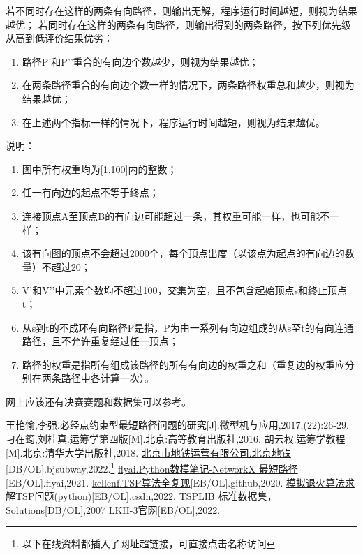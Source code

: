 \documentclass[12pt]{article}
\begin{document}
若不同时存在这样的两条有向路径，则输出无解，程序运行时间越短，则视为结果越优； 若同时存在这样的两条有向路径，则输出得到的两条路径，按下列优先级从高到低评价结果优劣：
\begin{enumerate}
	\item 路径P’和P’’重合的有向边个数越少，则视为结果越优；
	\item  在两条路径重合的有向边个数一样的情况下，两条路径权重总和越少，则视为结果越优；
	\item 在上述两个指标一样的情况下，程序运行时间越短，则视为结果越优。
\end{enumerate}
说明：
\begin{enumerate}
	\item 图中所有权重均为[1,100]内的整数；
	\item 任一有向边的起点不等于终点；
	\item 连接顶点A至顶点B的有向边可能超过一条，其权重可能一样，也可能不一样；
	\item 该有向图的顶点不会超过2000个，每个顶点出度（以该点为起点的有向边的数量）不超过20；
	\item V’和V’’中元素个数均不超过100，交集为空，且不包含起始顶点s和终止顶点t；
	\item 从s到t的不成环有向路径P是指，P为由一系列有向边组成的从s至t的有向连通路径，且不允许重复经过任一顶点；
	\item 路径的权重是指所有组成该路径的所有有向边的权重之和（重复边的权重应分别在两条路径中各计算一次）。
\end{enumerate}
网上应该还有决赛赛题和数据集可以参考。
\begin{thebibliography}{1}
王艳愉,李强.必经点约束型最短路径问题的研究[J].微型机与应用,2017,(22):26-29.
刁在筠,刘桂真.运筹学第四版[M].北京:高等教育出版社,2016.
胡云权.运筹学教程[M].北京:清华大学出版社,2018.
\href{https://www.bjsubway.com/}{北京市地铁运营有限公司.北京地铁}[DB/OL].bjsubway,2022.\footnote{以下在线资料都插入了网址超链接，可直接点击名称访问}
\href{https://www.flyai.com/article/artfd2570e423665ccbf7f9929c?type=e}{flyai.Python数模笔记-NetworkX 最短路径}[EB/OL].flyai,2021.
\href{https://github.com/kellenf/TSP\_collection}{kellenf.TSP算法全复现}[EB/OL].github,2020.
\href{https://blog.csdn.net/weixin\_37522117/article/details/125149593?spm=1001.2101.3001.6650.3&utm\_medium=distribute.pc\_relevant.none-task-blog-2\%7Edefault\%7EESLANDING\%7Edefault-3-125149593-blog-109305769.pc\_relevant\_landingrelevant&depth\_1-utm\_source=distribute.pc\_relevant.none-task-blog-2\%7Edefault\%7EESLANDING\%7Edefault-3-125149593-blog-109305769.pc\_relevant\_landingrelevant}{模拟退火算法求解TSP问题(python)}[EB/OL].csdn,2022.
\href{http://comopt.ifi.uni-heidelberg.de/software/TSPLIB95/}{TSPLIB 标准数据集}，\href{http://comopt.ifi.uni-heidelberg.de/software/TSPLIB95/STSP.html}{Solutions}[DB/OL],2007
\href{http://webhotel4.ruc.dk/~keld/research/LKH-3/}{LKH-3官网}[EB/OL],2022.
\end{thebibliography}
\end{document}
